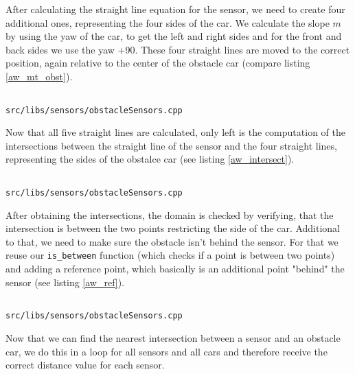\documentclass[paper=a4, fontsize=11pt]{scrreprt}
\begin{document}
After calculating the straight line equation for the sensor,
we need to create four additional ones, representing the four sides of the car.
We calculate the slope $m$ by using the yaw of the car, to get the left and right sides
and for the front and back sides we use the yaw $+$90\degree{}.
These four straight lines are moved to the correct position,
again relative to the center of the obstacle car (compare listing \ref{aw_mt_obst}).

\begin{listing}[ht]
  \inputminted[firstline=130,linenos=true,lastline=152,gobble=3]{c++}{../../../simulators/speed-dreams/src/libs/sensors/obstacleSensors.cpp}
  \caption{\texttt{src/libs/sensors/obstacleSensors.cpp}}\label{aw_mt_obst}
\end{listing}

Now that all five straight lines are calculated,
only left is the computation of the intersections between the straight line of the sensor
and the four straight lines, representing the sides of the obstalce car (see listing \ref{aw_intersect}).

\begin{listing}[ht]
  \inputminted[firstline=154,linenos=true,lastline=164,gobble=3]{c++}{../../../simulators/speed-dreams/src/libs/sensors/obstacleSensors.cpp}
  \caption{\texttt{src/libs/sensors/obstacleSensors.cpp}}\label{aw_intersect}
\end{listing}

After obtaining the intersections, the domain is checked by verifying,
that the intersection is between the two points restricting the side of the car.
Additional to that, we need to make sure the obstacle isn't behind the sensor.
For that we reuse our \texttt{is\_between} function (which checks if a point is between two points) and adding a reference point,
which basically is an additional point "behind" the sensor (see listing \ref{aw_ref}).

\begin{listing}[ht]
  \inputminted[firstline=98,linenos=true,lastline=99,gobble=2]{c++}{../../../simulators/speed-dreams/src/libs/sensors/obstacleSensors.cpp}
  \caption{\texttt{src/libs/sensors/obstacleSensors.cpp}}\label{aw_ref}
\end{listing}

Now that we can find the nearest intersection between a sensor and an obstacle car,
we do this in a loop for all sensors and all cars and therefore receive the correct distance value for each sensor.
\end{document}
